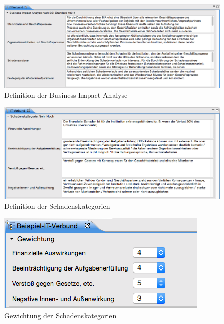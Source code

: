 \documentclass[a4paper,10pt]{book}
\begin{document}
\begin{figure}[htb!]
  \centering
  \includegraphics[width=\linewidth]{Screenshot/definition-der-business-impact-analyse.png}
  \caption{Definition der Business Impact Analyse}
  \label{fig:definition-der-business-impcat-analyse}
\end{figure}

\begin{figure}[htb!]
  \centering
  \includegraphics[width=\linewidth]{Screenshot/definition-der-schadenskategorien.png}
  \caption{Definition der Schadenskategorien}
  \label{fig:definition-der-schadenskategorien}
\end{figure}

\begin{figure}[htb!]
  \centering
  \includegraphics[scale=0.5]{Screenshot/gewichtung-der-schadenskategorien.png}
  \caption{Gewichtung der Schadenskategorien}
  \label{fig:gewichtung-der-schadenskategorien}
\end{figure}
\end{document}
